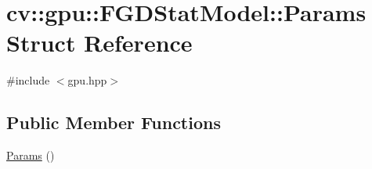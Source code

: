 \hypertarget{structcv_1_1gpu_1_1FGDStatModel_1_1Params}{\section{cv\-:\-:gpu\-:\-:F\-G\-D\-Stat\-Model\-:\-:Params Struct Reference}
\label{structcv_1_1gpu_1_1FGDStatModel_1_1Params}
}


{\ttfamily \#include $<$gpu.\-hpp$>$}

\subsection*{Public Member Functions}
\begin{DoxyCompactItemize}
\item 
\hyperlink{structcv_1_1gpu_1_1FGDStatModel_1_1Params_aea6ae343ed5e6754331e7c63af0f057f}{Params} ()
\end{DoxyCompactItemize}
